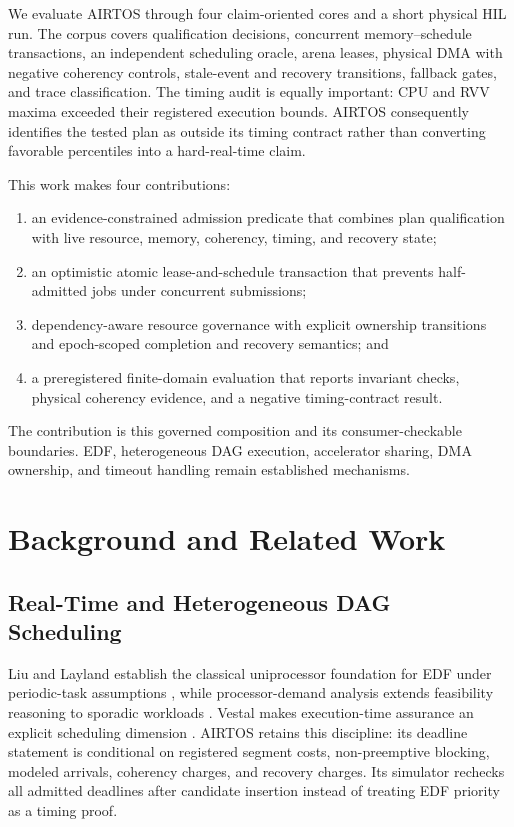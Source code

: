 \documentclass[lettersize,journal]{IEEEtran}
\begin{document}
We evaluate AIRTOS through four claim-oriented cores and a short physical HIL
run. The corpus covers qualification decisions, concurrent memory--schedule
transactions, an independent scheduling oracle, arena leases, physical DMA
with negative coherency controls, stale-event and recovery transitions,
fallback gates, and trace classification. The timing audit is equally
important: CPU and RVV maxima exceeded their registered execution bounds.
AIRTOS consequently identifies the tested plan as outside its timing contract
rather than converting favorable percentiles into a hard-real-time claim.

This work makes four contributions:
\begin{enumerate}
  \item an evidence-constrained admission predicate that combines plan
  qualification with live resource, memory, coherency, timing, and recovery
  state;
  \item an optimistic atomic lease-and-schedule transaction that prevents
  half-admitted jobs under concurrent submissions;
  \item dependency-aware resource governance with explicit ownership
  transitions and epoch-scoped completion and recovery semantics; and
  \item a preregistered finite-domain evaluation that reports invariant checks,
  physical coherency evidence, and a negative timing-contract result.
\end{enumerate}
The contribution is this governed composition and its consumer-checkable
boundaries. EDF, heterogeneous DAG execution, accelerator sharing, DMA
ownership, and timeout handling remain established mechanisms.

\section{Background and Related Work}
\subsection{Real-Time and Heterogeneous DAG Scheduling}
Liu and Layland establish the classical uniprocessor foundation for EDF under
periodic-task assumptions \cite{liu1973scheduling}, while processor-demand
analysis extends feasibility reasoning to sporadic workloads
\cite{baruah1990preemptively}. Vestal makes execution-time assurance an
explicit scheduling dimension \cite{vestal2007preemptive}. AIRTOS retains this
discipline: its deadline statement is conditional on registered segment costs,
non-preemptive blocking, modeled arrivals, coherency charges, and recovery
charges. Its simulator rechecks all admitted deadlines after candidate
insertion instead of treating EDF priority as a timing proof.
\end{document}
